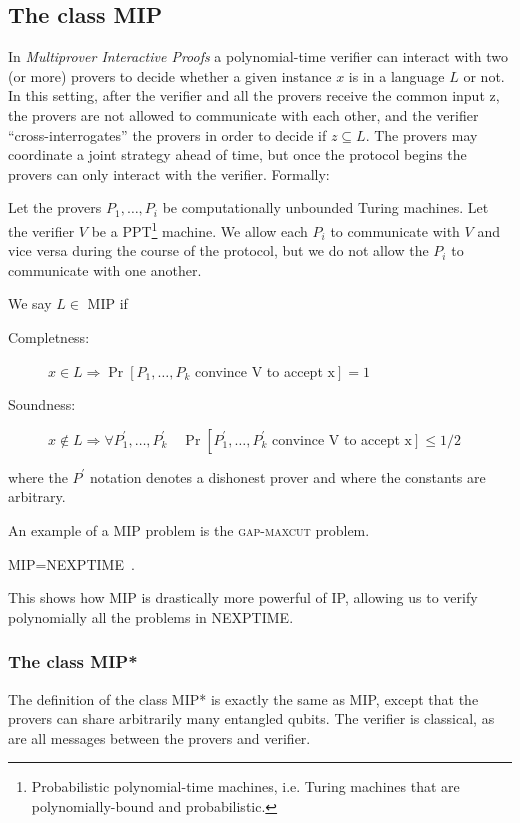 \subsection{The class MIP}
In \emph{Multiprover Interactive Proofs} a polynomial-time verifier can interact with two (or more) provers to decide
whether a given instance $x$ is in a language $L$ or not. In this setting, after the verifier and all the provers receive the common input z, the provers are not allowed to communicate with each other, and the verifier “cross-interrogates” the provers in order to decide if $z \subseteq L$. The provers may coordinate a joint strategy ahead of time, but once the protocol begins the provers can only interact with the verifier. Formally:
\begin{defn}
    Let the provers $P_{1}, \ldots, P_{i}$ be computationally unbounded Turing machines. Let the verifier $V$ be a PPT\footnote{Probabilistic polynomial-time machines, i.e. Turing machines that are polynomially-bound and probabilistic.} machine. We allow each $P_{i}$ to communicate with $V$ and vice versa during the course of the protocol, but we do not allow the $P_{i}$ to communicate with one another. 
    
    We say $L \in$ MIP if 
    \begin{description}
\item[Completness: ]$x \in L \Rightarrow \operatorname{Pr}\left[P_{1}, \ldots, P_{k}\right.$ convince $\mathrm{V}$ to accept $\left.\mathrm{x}\right]=1$
\item[Soundness: ]$x \notin L \Rightarrow \forall P_{1}^{\prime}, \ldots, P_{k}^{\prime} \quad \operatorname{Pr}\left[P_{1}^{\prime}, \ldots, P_{k}^{\prime}\right.$ convince $\mathrm{V}$ to accept $\left.\mathrm{x}\right] \leq 1 / 2$
    \end{description}   
    where the $P^{\prime}$ notation denotes a dishonest prover and where the constants are arbitrary.
\end{defn}

An example of a MIP problem is the \textsc{gap-maxcut} problem.
\begin{theorem}
MIP=NEXPTIME~\cite{topicsin}.
\end{theorem}

This shows how MIP is drastically more powerful of IP, allowing us to verify polynomially all the problems in NEXPTIME.


\subsubsection{The class MIP*}
The definition of the class MIP* is exactly the same as MIP, except that the provers can share arbitrarily many entangled qubits. The verifier is classical, as are all messages between the provers and verifier. 

